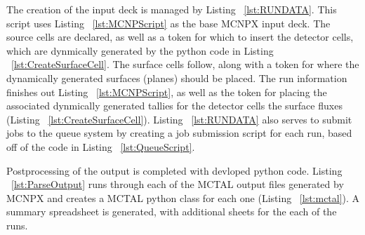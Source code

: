 
The creation of the input deck is managed by Listing ~\ref{lst:RUNDATA}.
This script uses Listing ~\ref{lst:MCNPScript} as the base MCNPX input deck.
The source cells are declared, as well as a token for which to insert the detector cells, which are dynmically generated by the python code in Listing ~\ref{lst:CreateSurfaceCell}.
The surface cells follow, along with a token for where the dynamically generated surfaces (planes) should be placed.
The run information finishes out Listing ~\ref{lst:MCNPScript}, as well as the token for placing the associated dynmically generated tallies for the detector cells the surface fluxes (Listing ~\ref{lst:CreateSurfaceCell}).
Listing ~\ref{lst:RUNDATA} also serves to submit jobs to the queue system by creating a job submission script for each run, based off of the code in Listing ~\ref{lst:QueueScript}.

Postprocessing of the output is completed with devloped python code.
Listing ~\ref{lst:ParseOutput} runs through each of the MCTAL output files generated by MCNPX and creates a MCTAL python class for each one (Listing ~\ref{lst:mctal}).
A summary spreadsheet is generated, with additional sheets for the each of the runs.

%
%
%
%

%
%
